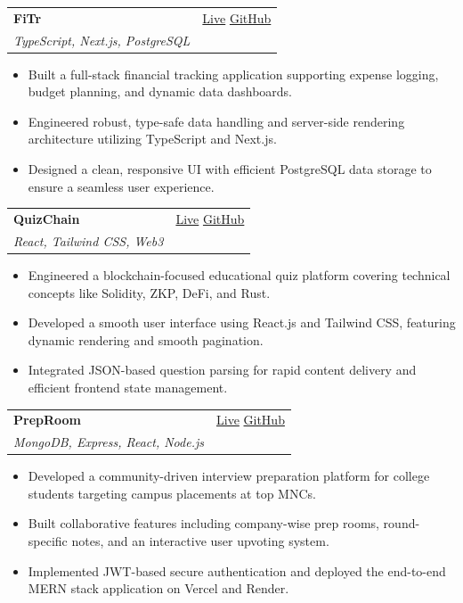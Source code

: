\documentclass[letterpaper,11pt]{article}
\makeatletter
\newcommand{\resumeSubheading}[4]{
  \vspace{-1pt}\item
    \begin{tabular*}{0.97\textwidth}{l@{\extracolsep{\fill}}r}
      \textbf{#1} & #2 \\
      \textit{\small#3} & \textit{\small #4} \\
    \end{tabular*}\vspace{-5pt}
}
\newcommand{\resumeItemListStart}{\begin{itemize}}
\newcommand{\resumeItemListEnd}{\end{itemize}\vspace{-5pt}}
\makeatother
\begin{document}
    

    \resumeSubheading
      {FiTr}{\href{http://fitr-navy.vercel.app}{Live} \textbar{} \href{https://github.com/soham203/Fitr}{GitHub}}
      {\normalfont{\textbf{Tech Stack:}} TypeScript, Next.js, PostgreSQL}{}
      \resumeItemListStart
        \item\small{Built a full-stack financial tracking application supporting expense logging, budget planning, and dynamic data dashboards.}
        \item\small{Engineered robust, type-safe data handling and server-side rendering architecture utilizing TypeScript and Next.js.}
        \item\small{Designed a clean, responsive UI with efficient PostgreSQL data storage to ensure a seamless user experience.}
      \resumeItemListEnd

    \resumeSubheading
      {QuizChain}{\href{https://web3-quiz-kappa.vercel.app/}{Live} \textbar{} \href{https://github.com/soham203/Web3-Quiz}{GitHub}}
      {\normalfont{\textbf{Tech Stack:}} React, Tailwind CSS, Web3}{}
      \resumeItemListStart
        \item\small{Engineered a blockchain-focused educational quiz platform covering technical concepts like Solidity, ZKP, DeFi, and Rust.}
        \item\small{Developed a smooth user interface using React.js and Tailwind CSS, featuring dynamic rendering and smooth pagination.}
        \item\small{Integrated JSON-based question parsing for rapid content delivery and efficient frontend state management.}
      \resumeItemListEnd

\resumeSubheading
      {PrepRoom}{\href{https://under-maintenance-site.vercel.app/}{Live} \textbar{} \href{https://github.com/soham203/UnderMaintenance}{GitHub}}
      {\normalfont{\textbf{Tech Stack:}} MongoDB, Express, React, Node.js}{}
      \resumeItemListStart
        \item\small{Developed a community-driven interview preparation platform for college students targeting campus placements at top MNCs.}
        \item\small{Built collaborative features including company-wise prep rooms, round-specific notes, and an interactive user upvoting system.}
        \item\small{Implemented JWT-based secure authentication and deployed the end-to-end MERN stack application on Vercel and Render.}
      \resumeItemListEnd
\end{document}

